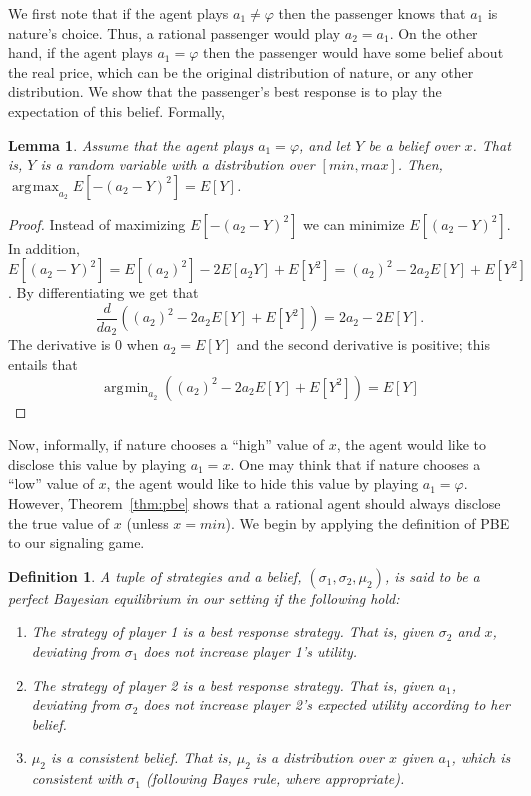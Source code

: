 \documentclass[letterpaper]{article} %
\DeclareMathOperator*{\argmin}{\arg\!\min}
\DeclareMathOperator*{\argmax}{\arg\!\max}
\newtheorem{definition}{Definition}
\newtheorem{lemma}{Lemma}
\begin{document}
We first note that if the agent plays $a_1 \neq \varphi$ then the passenger knows that $a_1$ is nature's choice. Thus, a rational passenger would play $a_2=a_1$. On the other hand, if the agent plays $a_1=\varphi$ then the passenger would have some belief about the real price, which can be the original distribution of nature, or any other distribution. We show that the passenger's best response is to play the expectation of this belief. Formally,
\begin{lemma}
\label{lemma:belief}
Assume that the agent plays $a_1=\varphi$, and let $Y$ be a belief over $x$. That is, $Y$ is a random variable with a distribution over $[min,max]$. Then, $\argmax_{a_2} E[-(a_2-Y)^2] = E[Y]$. \end{lemma}
\begin{proof}
Instead of maximizing $E[-(a_2-Y)^2]$ we can minimize $E[(a_2-Y)^2]$. In addition, $E[(a_2-Y)^2] = E[(a_2)^2] -2E[a_2 Y] + E[Y^2] = (a_2)^2 -2a_2 E[Y] + E[Y^2]$. By differentiating we get that
\[ \frac d {da_2} \left((a_2)^2 -2a_2 E[Y] + E[Y^2]\right) = 2a_2 -2E[Y].\]
The derivative is $0$ when $a_2 = E[Y]$ and the second derivative is positive; this entails that
\[\argmin_{a_2} \left((a_2)^2 -2a_2 E[Y] + E[Y^2]\right) = E[Y]\]
\end{proof}

Now, informally, if nature chooses a ``high'' value of $x$, the agent would like to disclose this value by playing $a_1=x$. One may think that if nature chooses a ``low'' value of $x$, the agent would like to hide this value by playing $a_1=\varphi$. However, Theorem~\ref{thm:pbe} shows that a rational agent should always disclose the true value of $x$ (unless $x=min$). We begin by applying the definition of PBE to our signaling game.
\begin{definition}
A tuple of strategies and a belief, $(\sigma_1, \sigma_2, \mu_2)$, is said to be a perfect Bayesian equilibrium in our setting if the following hold:
\begin{enumerate}
    \item The strategy of player 1 is a best response strategy. That is, given $\sigma_2$ and $x$, deviating from $\sigma_1$ does not increase player 1's utility. %
    \item The strategy of player 2 is a best response strategy. That is, given $a_1$, deviating from $\sigma_2$ does not increase player 2's expected utility according to her belief.
    \item $\mu_2$ is a consistent belief.
    That is, $\mu_2$ is a distribution over $x$ given $a_1$, which is consistent with $\sigma_1$ (following Bayes rule, where appropriate).
\end{enumerate}
\end{definition}
\end{document}
